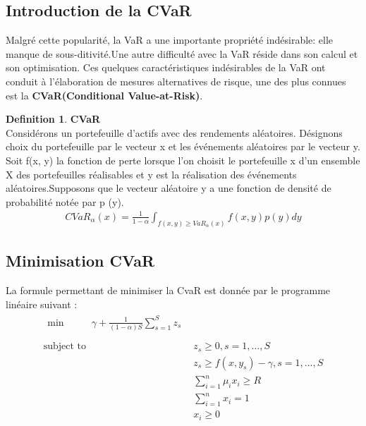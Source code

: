 \documentclass[12pt]{article}
\theoremstyle{definition}
\newtheorem{definition}{Definition}[section]
\theoremstyle{definition}
\begin{document}
\subsection{Introduction de la CVaR}
Malgré cette popularité, la VaR a une importante propriété indésirable: elle manque de sous-ditivité.Une autre difficulté avec la VaR réside dans son calcul et son optimisation. Ces quelques caractéristiques indésirables de la VaR ont conduit à l'élaboration de mesures alternatives de risque, une des plus connues est la \textbf{CVaR(Conditional Value-at-Risk)}.\\
\begin{definition}{ \textbf{CVaR}} \\
Considérons un portefeuille d'actifs avec des rendements aléatoires. Désignons choix du portefeuille par le vecteur x et les événements aléatoires par le vecteur y. 
Soit f(x, y) la fonction de perte lorsque l'on choisit le portefeuille x d'un ensemble X des portefeuilles réalisables et y est la réalisation des événements aléatoires.Supposons que le vecteur aléatoire y a une fonction de densité de probabilité notée par p (y).
\boldmath\begin{eqnarray}
CVaR_{\alpha}(x) = \frac{1}{1-\alpha} \int_{f(x,y) \geq VaR_{\alpha}(x)}^{} f(x,y)p(y) dy
\end{eqnarray}
\end{definition}

\subsection{Minimisation CVaR}
La formule permettant de minimiser la CvaR est donnée par le programme linéaire suivant :
\begin{align}
\begin{split}
\text{min}\qquad &
   \gamma + \frac{1}{(1-\alpha)S} \sum_{s=1}^{S} z_{s} \\
  \end{split}
\label{green} 
\\[2ex]
\text{subject to}\qquad & z_{s} \geq 0, s = 1,...,S  %
\label{green-constraint-1} 
\\
& z_{s} \geq  f(x,y_{s}) - \gamma, s= 1,...,S  %
\label{green-constraint-2}
\\
& \sum_{i=1}^{n} \mu_{i}x_{i} \geq R
\label{green-constraint-3}
\\ & \sum_{i=1}^{n} x_{i} = 1
\label{green-constraint-4}
\\ &  x_{i} \geq 0
\end{align}
\end{document}
